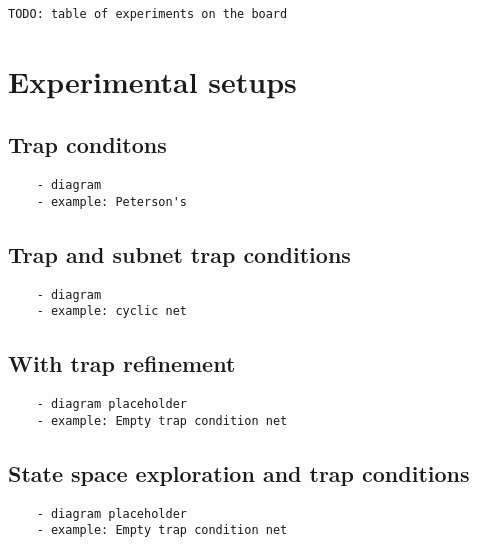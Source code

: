 \documentclass{article}
\begin{document}
\verb?TODO: table of experiments on the board?

\section{Experimental setups}

\subsection{Trap conditons}
\begin{verbatim}
    - diagram
    - example: Peterson's
\end{verbatim}

\subsection{Trap and subnet trap conditions}
\begin{verbatim}
    - diagram
    - example: cyclic net
\end{verbatim}

\subsection{With trap refinement}
\begin{verbatim}
    - diagram placeholder
    - example: Empty trap condition net
\end{verbatim}

\subsection{State space exploration and trap conditions}
\begin{verbatim}
    - diagram placeholder
    - example: Empty trap condition net
\end{verbatim}


\newpage
\end{document}
